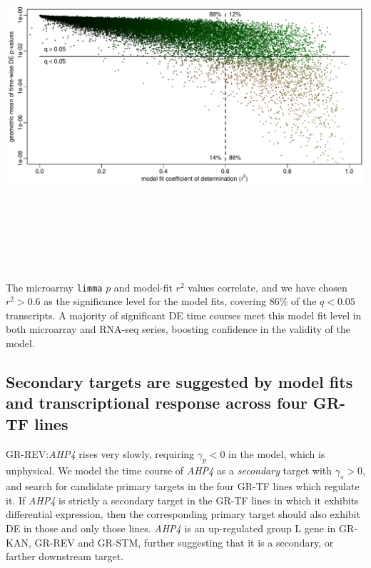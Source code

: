 \documentclass[aspb,landscape]{a0poster}
\newlength{\figtopspace}
\begin{document}
\begin{multicols}{3}
  \begin{center}\vspace{\figtopspace}
    \includegraphics[width=10in,height=5in]{p-vs-r2}
  \end{center}

  The microarray \texttt{limma} $p$ and model-fit $r^2$ values correlate, and we have chosen $r^2>0.6$ as the significance
  level for the model fits, covering 86\% of the $q<0.05$ transcripts. A majority of significant DE time courses meet
  this model fit level in both microarray and RNA-seq series, boosting confidence in the validity of the model.

  \subsection*{Secondary targets are suggested by model fits and transcriptional response across four GR-TF lines}

  GR-REV:\textit{AHP4} rises very slowly, requiring $\gamma_p<0$ in the model, which is unphysical.
  We model the time course of \textit{AHP4} as a \textit{secondary} target with $\gamma_s>0$, and search for candidate primary targets in the four GR-TF lines which regulate it.
  If \textit{AHP4} is strictly a secondary target in the GR-TF lines in which it exhibits differential expression,
  then the corresponding primary target should also exhibit DE in those and only those lines. \textit{AHP4} is an up-regulated group L gene in GR-KAN, GR-REV and GR-STM, further suggesting that it is a secondary,
  or farther downstream target.
    

\end{multicols}
\end{document}
